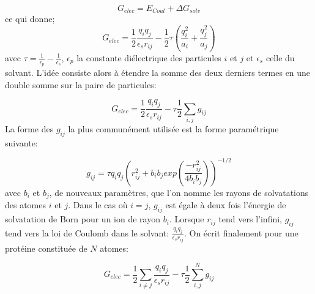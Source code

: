 \begin{equation}
  \label{eq:GB}
  G_{elec} =  E_{Coul} + \Delta G_{solv}
\end{equation}
ce qui donne;
\begin{equation}
  \label{eq:GB}
 G_{elec} =  \frac{1}{2}  \frac{q_iq_j}{\epsilon_s r_{ij}} - \frac{1}{2}  \tau ( \frac{q_i^2}{a_i} +  \frac{q_j^2}{a_j})
\end{equation}
avec $ \tau = \frac{1}{\epsilon_p} - \frac{1}{\epsilon_s}$, $\epsilon_p$ la constante diélectrique des particules $i$ et $j$ et $\epsilon_s$ celle du solvant. L'idée consiste alors à étendre la somme des deux derniers termes en une double somme sur la paire de particules:

\begin{equation}
  G_{elec} = \frac{1}{2} \frac{q_iq_j}{\epsilon_s r_{ij}} - \tau \frac{1}{2} \sum_{i,j} g_{ij}
\end{equation}
La forme des $g_{ij}$ la plus communément utilisée est la forme paramétrique suivante:


\begin{equation}
  \label{eq:GBg}
  g_{ij}= \tau q_iq_j (r^2_{ij} + b_ib_j exp(\frac{-r^2_{ij}}{4b_ib_j}))^{-1/2} 
\end{equation}
avec $b_i$ et $b_j$, de nouveaux paramètres, que l'on nomme les rayons de solvatations des atomes $i$ et $j$. Dans le cas où $i=j$, $g_{ij}$ est égale à deux fois l'énergie de solvatation de Born pour un ion de rayon $b_i$. Lorsque $r_{ij}$ tend vers l'infini, $g_{ij}$ tend vers la loi de Coulomb dans le solvant: $\frac{q_iq_j}{\epsilon_s r_{ij}}$. On écrit finalement pour une protéine constituée de $N$ atomes:

\begin{equation}
  G_{elec} = \frac{1}{2} \sum_{i \neq j} \frac{q_iq_j}{\epsilon_sr_{ij}} - \tau \frac{1}{2} \sum_{i,j}^N g_{ij}
\end{equation}



